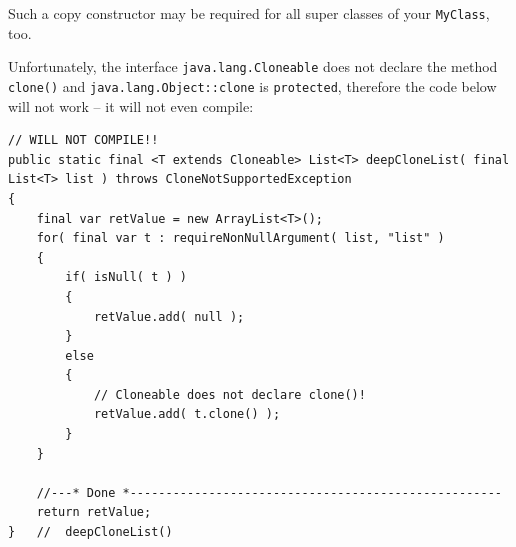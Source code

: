 Such a copy constructor may be required for all super classes of your \lstinline|MyClass|, too.

Unfortunately, the interface \lstinline|java.lang.Cloneable| does not declare the method \lstinline|clone()| and \lstinline|java.lang.Object::clone| is \lstinline|protected|, therefore the code below will not work – it will not even compile:
\begin{lstlisting}
// WILL NOT COMPILE!!
public static final <T extends Cloneable> List<T> deepCloneList( final List<T> list ) throws CloneNotSupportedException
{
	final var retValue = new ArrayList<T>();
	for( final var t : requireNonNullArgument( list, "list" ) 
    {
        if( isNull( t ) )
        {
            retValue.add( null );
        }
        else    
        {
            // Cloneable does not declare clone()!
            retValue.add( t.clone() );
        }
    } 

    //---* Done *----------------------------------------------------
    return retValue;
}   //  deepCloneList()
\end{lstlisting}


